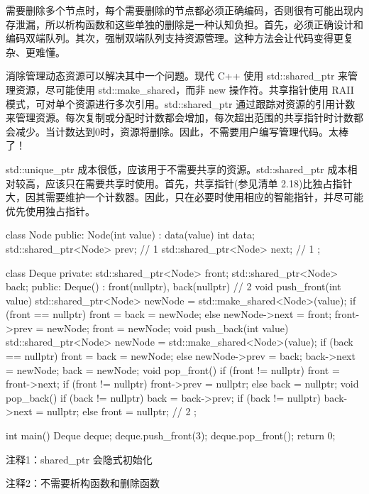 需要删除多个节点时，每个需要删除的节点都必须正确编码，否则很有可能出现内存泄漏，所以析构函数和这些单独的删除是一种认知负担。首先，必须正确设计和编码双端队列。其次，强制双端队列支持资源管理。这种方法会让代码变得更复杂、更难懂。


消除管理动态资源可以解决其中一个问题。现代 C++ 使用 std::shared\_ptr 来管理资源，尽可能使用 std::make\_shared，而非 new 操作符。共享指针使用 RAII 模式，可对单个资源进行多次引用。std::shared\_ptr 通过跟踪对资源的引用计数来管理资源。每次复制或分配时计数都会增加，每次超出范围的共享指针时计数都会减少。当计数达到0时，资源将删除。因此，不需要用户编写管理代码。太棒了！

std::unique\_ptr 成本很低，应该用于不需要共享的资源。std::shared\_ptr 成本相对较高，应该只在需要共享时使用。首先，共享指针(参见清单 2.18)比独占指针大，因其需要维护一个计数器。因此，只在必要时使用相应的智能指针，并尽可能优先使用独占指针。


\begin{cpp}
class Node {
public:
  Node(int value) : data(value) {}
  int data;
  std::shared_ptr<Node> prev; // 1
  std::shared_ptr<Node> next; // 1
};

class Deque {
private:
  std::shared_ptr<Node> front;
  std::shared_ptr<Node> back;
public:
  Deque() : front(nullptr), back(nullptr) {} // 2
  void push_front(int value) {
    std::shared_ptr<Node> newNode = std::make_shared<Node>(value);
    if (front == nullptr)
      front = back = newNode;
    else {
      newNode->next = front;
      front->prev = newNode;
      front = newNode;
    }
  }
  void push_back(int value) {
    std::shared_ptr<Node> newNode = std::make_shared<Node>(value);
    if (back == nullptr)
      front = back = newNode;
    else {
      newNode->prev = back;
      back->next = newNode;
      back = newNode;
    }
  }
  void pop_front() {
    if (front != nullptr) {
      front = front->next;
    if (front != nullptr)
      front->prev = nullptr;
    else
      back = nullptr;
    }
  }
  void pop_back() {
    if (back != nullptr) {
      back = back->prev;
      if (back != nullptr)
        back->next = nullptr;
      else
        front = nullptr;
    } // 2
  }
};

int main() {
  Deque deque;
  deque.push_front(3);
  deque.pop_front();
  return 0;
}
\end{cpp}

{\footnotesize
注释1：shared\_ptr 会隐式初始化

注释2：不需要析构函数和删除函数
}

